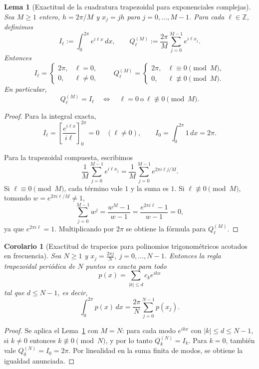 \documentclass[a4paper,11pt]{report}
\newtheorem{lemma}[theorem]{Lema}
\newtheorem{corollary}[theorem]{Corolario}
\begin{document}
\begin{lemma}[Exactitud de la cuadratura trapezoidal para exponenciales complejas]\label{lem:trap_exp}
Sea $M \geq 1$ entero, $h = 2\pi/M$ y $x_j = jh$ para $j=0,\ldots,M-1$. Para cada $\ell\in\mathbb Z$, definimos
\[
I_\ell:=\int_0^{2\pi}e^{i\ell x}\,dx,
\qquad
Q_\ell^{(M)}:=\frac{2\pi}{M}\sum_{j=0}^{M-1}e^{i\ell x_j}.
\]
Entonces
\[
I_\ell=
\begin{cases}
2\pi,& \ell=0,\\
0,& \ell\neq 0,
\end{cases}
\qquad
Q_\ell^{(M)}=
\begin{cases}
2\pi,& \ell\equiv 0\pmod M,\\
0,& \ell\not\equiv 0\pmod M.
\end{cases}
\]
En particular,
\[
Q_\ell^{(M)}=I_\ell
\quad\Longleftrightarrow\quad
\ell=0\ \text{o}\ \ell\not\equiv 0\pmod M.
\]
\end{lemma}
\begin{proof}
Para la integral exacta,
\[
I_\ell=\left[\frac{e^{i\ell x}}{i\ell}\right]_0^{2\pi}=0\quad(\ell\neq 0),
\qquad
I_0=\int_0^{2\pi}1\,dx=2\pi.
\]

Para la trapezoidal compuesta, escribimos
\[
\frac{1}{M}\sum_{j=0}^{M-1}e^{i\ell x_j}
=\frac{1}{M}\sum_{j=0}^{M-1}e^{2\pi i\ell j/M}.
\]
Si $\ell\equiv 0\pmod M$, cada término vale $1$ y la suma es $1$. Si $\ell\not\equiv 0\pmod M$, tomando $w=e^{2\pi i\ell/M}\neq 1$,
\[
\sum_{j=0}^{M-1} w^j = \frac{w^M - 1}{w - 1} = \frac{e^{2\pi i \ell} - 1}{w - 1} = 0,
\]
ya que $e^{2\pi i \ell} = 1$. Multiplicando por $2\pi$ se obtiene la fórmula para $Q_\ell^{(M)}$.
\end{proof}

\begin{corollary}[Exactitud de trapecios para polinomios trigonométricos acotados en frecuencia]\label{cor:trap_exactitud_grado_d}
Sea $N\ge 1$ y $x_j=\frac{2\pi j}{N}$, $j=0,\dots,N-1$. Entonces la regla trapezoidal periódica de $N$ puntos es exacta para todo
\[
p(x)=\sum_{|k|\le d} c_k e^{ikx}
\]
tal que $d\le N-1$, es decir,
\[
\int_0^{2\pi}p(x)\,dx
=\frac{2\pi}{N}\sum_{j=0}^{N-1}p(x_j).
\]
\end{corollary}

\begin{proof}
Se aplica el Lema~\ref{lem:trap_exp} con $M=N$: para cada modo $e^{ikx}$ con $|k|\le d\le N-1$, si $k\neq 0$ entonces $k\not\equiv 0\pmod N$, y por lo tanto $Q_k^{(N)}=I_k$. Para $k=0$, también vale $Q_0^{(N)}=I_0=2\pi$. Por linealidad en la suma finita de modos, se obtiene la igualdad anunciada.
\end{proof}
\end{document}
